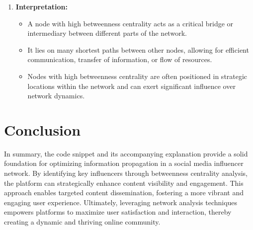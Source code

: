 \documentclass{article}
\begin{document}
\begin{enumerate}
    \item \textbf{Interpretation:}
    \begin{itemize}
        \item A node with high betweenness centrality acts as a critical bridge or intermediary between different parts of the network.
        \item It lies on many shortest paths between other nodes, allowing for efficient communication, transfer of information, or flow of resources.
        \item Nodes with high betweenness centrality are often positioned in strategic locations within the network and can exert significant influence over network dynamics.
    \end{itemize}
\end{enumerate}

\section{Conclusion}
\textbf{} In summary, the code snippet and its accompanying explanation provide a solid foundation for optimizing information propagation in a social media influencer network. By identifying key influencers through betweenness centrality analysis, the platform can strategically enhance content visibility and engagement. This approach enables targeted content dissemination, fostering a more vibrant and engaging user experience. Ultimately, leveraging network analysis techniques empowers platforms to maximize user satisfaction and interaction, thereby creating a dynamic and thriving online community.
\end{document}
